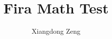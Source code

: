 \documentclass{article}
\title{Fira Math Test}
\author{Xiangdong Zeng}
\begin{document}
\maketitle

\tableofcontents

\clearpage

\makeatletter
\ExplSyntaxOn





\ExplSyntaxOff
\makeatother
\end{document}
